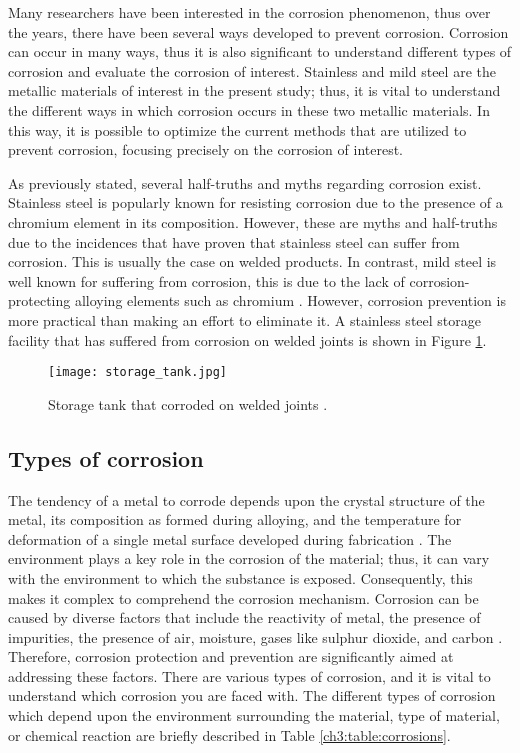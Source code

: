 Many researchers have been interested in the corrosion phenomenon, thus over the years, there have been several ways developed to prevent corrosion. Corrosion can occur in many ways, thus it is also significant to understand different types of corrosion and evaluate the corrosion of interest. Stainless and mild steel are the metallic materials of interest in the present study; thus, it is vital to understand the different ways in which corrosion occurs in these two metallic materials. In this way, it is possible to optimize the current methods that are utilized to prevent corrosion, focusing precisely on the corrosion of interest.

As previously stated, several half-truths and myths regarding corrosion exist. Stainless steel is popularly known for resisting corrosion due to the presence of a chromium element in its composition. However, these are myths and half-truths due to the incidences that have proven that stainless steel can suffer from corrosion. This is usually the case on welded products. In contrast, mild steel is well known for suffering from corrosion, this is due to the lack of corrosion-protecting alloying elements such as chromium \cite{hackerman1987theory}. However, corrosion prevention is more practical than making an effort to eliminate it. A stainless steel storage facility that has suffered from corrosion on welded joints is shown in Figure \ref{ch3:figure:tank}.
 
\begin{figure}[H]
    \centering
    \texttt{[image: storage\_tank.jpg]}
    \caption{Storage tank that corroded on welded joints \cite{karayan2014weld}.}
    \label{ch3:figure:tank}
\end{figure}

\subsection{Types of corrosion} 
The tendency of a metal to corrode depends upon the crystal structure of the metal, its composition as formed during alloying, and the temperature for deformation of a single metal surface developed during fabrication \cite{sourmail2005stainless}. The environment plays a key role in the corrosion of the material; thus, it can vary with the environment to which the substance is exposed. Consequently, this makes it complex to comprehend the corrosion mechanism. Corrosion can be caused by diverse factors that include the reactivity of metal, the presence of impurities, the presence of air, moisture, gases like sulphur dioxide, and carbon \cite{sourmail2005stainless}. Therefore, corrosion protection and prevention are significantly aimed at addressing these factors. There are various types of corrosion, and it is vital to understand which corrosion you are faced with. The different types of corrosion which depend upon the environment surrounding the material, type of material, or chemical reaction are briefly described in Table \ref{ch3:table:corrosions}.


